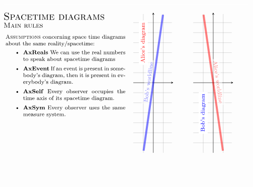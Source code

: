 \documentclass[xcolor=x11names]{beamer}
\begin{document}
\begin{frame}
\vspace{-.55cm}
\[\hspace{-1cm}
\footnotesize
\begin{tikzpicture}[>=stealth, scale=1,
world/.style={inner sep=0, minimum size=.15cm, fill=black, circle},
intension/.style={rounded corners=10pt, fill=white!90!gray, fill opacity=1, draw=gray, thick, inner sep=10},
worldline/.style={line width=1mm, rounded corners=1pt, opacity=.5},
axis/.style={->},
felirat/.style={inner sep=5, scale=.7},
bejaras/.style={blue}]


\node[anchor=north west, inner sep=0] at (0.5,8.5) {\textsc{\Large Spacetime diagrams}};
\node[anchor=north west, inner sep=0] at (0.5,8) {\textsc{\normalsize Main rules}};
\draw[white]  (0,0) rectangle (12.77,8.9);
\node[anchor=north west] at (0.5,7.5) {\begin{minipage}{6cm}
\textsc{Assumptions} concerning space time diagrams about the same reality/spacetime:
\begin{itemize}
\item \textbf{AxReals} We can use the real numbers to speak about spacetime diagrams
\item \textbf{AxEvent} If an event is present in somebody's diagram, then it is present in everybody's diagram.
\item \textbf{AxSelf} Every observer occupies the time axis of its spacetime diagram.
\item \textbf{AxSym} Every observer uses the same measure system.
\end{itemize}
\end{minipage}
};
\coordinate (XY) at (9,8.5) {} {};
\coordinate (-XY) at (7,1.5) {} {} {};
\coordinate (-X) at (7,5) {} {} {} {};
\coordinate (X) at (9,5) {} {} {} {};
\coordinate (Y) at (8,8.5) {};
\coordinate (-Y) at (8,1.5) {} {} {};
\draw [help lines, step=.5cm] (-XY) grid ([shift=(-135:1mm)]XY);
\draw[->] (-X)--(X);
\draw[->] (-Y)--(Y);
\node(A1) at (7.5,1.5) {};
\node(A2) at (8.5,8.5) {};
\begin{scope}[xshift=3cm]
\coordinate (2XY) at (9,8.5) {} {};
\coordinate (2-XY) at (7,1.5) {} {} {};
\coordinate (2-X) at (7,5) {} {} {} {};
\coordinate (2X) at (9,5) {} {} {} {};
\coordinate (2Y) at (8,8.5) {};
\coordinate (2-Y) at (8,1.5) {} {} {};
\draw [help lines, step=.5cm] (2-XY) grid ([shift=(-135:1mm)]2XY);
\draw[->] (2-X)--(2X);
\draw[->] (2-Y)--(2Y);
\node(2A1) at (8.5,1.5) {};
\node(2A2) at (7.5,8.5) {};
\end{scope}
\node[rotate=90, text=red, fill=white] at (7.5,7) {Alice's diagram};
\node[rotate=90, text=blue, fill=white]  at (10.5,3.5)  {Bob's diagram};
\draw[worldline, blue] (A1)--(A2) node[fill=white, sloped, above, pos=.5]{Bob's worldline};
\draw[worldline, red] (2A1)--(2A2) node[fill=white, sloped, above, pos=.5]{Alice's worldline};
\end{tikzpicture}\]
\end{frame}
\end{document}
